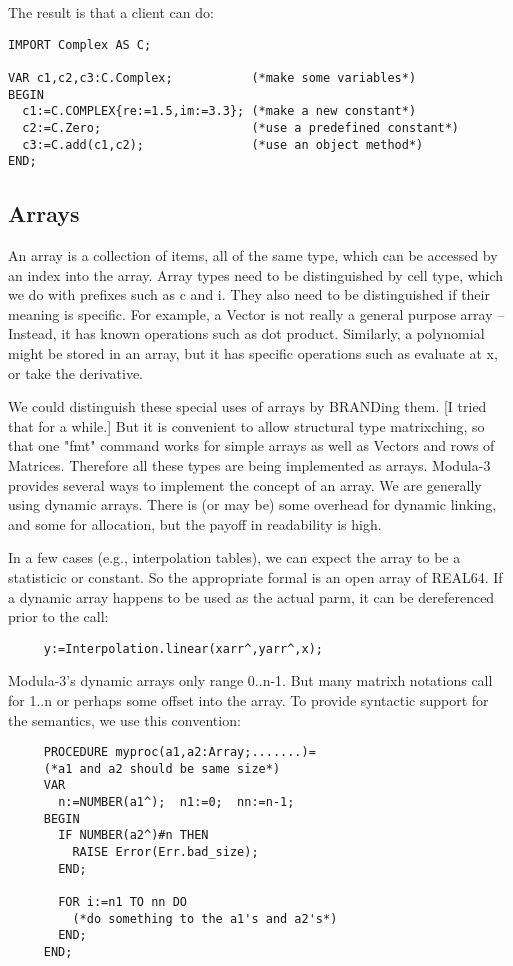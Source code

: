 The result is that a client can do:
\begin{tt} \begin{verbatim}
IMPORT Complex AS C;

VAR c1,c2,c3:C.Complex;           (*make some variables*)
BEGIN
  c1:=C.COMPLEX{re:=1.5,im:=3.3}; (*make a new constant*)
  c2:=C.Zero;                     (*use a predefined constant*)
  c3:=C.add(c1,c2);               (*use an object method*)
END;
\end{verbatim} \end{tt}

\subsection{Arrays}
An array is a collection of items, all of the same type,
which can be accessed by an index into the array.  Array
types need to be distinguished by cell type, which we do
with prefixes such as c and i.  They also need to be
distinguished if their meaning is specific.  For example, a
Vector is not really a general purpose array -- Instead, it
has known operations such as dot product.  Similarly, a
polynomial might be stored in an array, but it has specific
operations such as evaluate at x, or take the derivative.

We could distinguish these special uses of arrays by
BRANDing them.  [I tried that for a while.]  But it is
convenient to allow structural type matrixching, so that one
"fmt" command works for simple arrays as well as Vectors and
rows of Matrices.  Therefore all these types are being
implemented as arrays.  Modula-3 provides several ways to
implement the concept of an array.  We are generally using
dynamic arrays.  There is (or may be) some overhead for
dynamic linking, and some for allocation, but the payoff in
readability is high.

In a few cases (e.g., interpolation tables), we can expect
the array to be a statisticic or constant.  So the appropriate
formal is an open array of REAL64.  If a dynamic array
happens to be used as the actual parm, it can be
dereferenced prior to the call:

\begin{tt} \begin{verbatim}
     y:=Interpolation.linear(xarr^,yarr^,x);
\end{verbatim} \end{tt}

Modula-3's dynamic arrays only range 0..n-1.  But many matrixh
notations call for 1..n or perhaps some offset into the
array.  To provide syntactic support for the semantics, we
use this convention:
\begin{tt} \begin{verbatim}
     PROCEDURE myproc(a1,a2:Array;.......)=
     (*a1 and a2 should be same size*)
     VAR
       n:=NUMBER(a1^);  n1:=0;  nn:=n-1;
     BEGIN
       IF NUMBER(a2^)#n THEN
         RAISE Error(Err.bad_size);
       END;
     
       FOR i:=n1 TO nn DO
         (*do something to the a1's and a2's*)
       END;
     END;
\end{verbatim} \end{tt}

